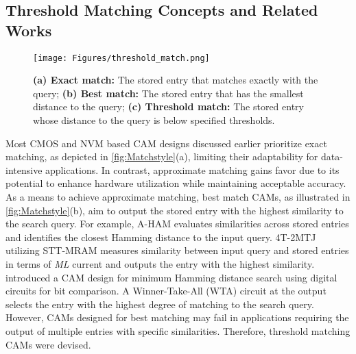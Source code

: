 \subsection{Threshold Matching Concepts and Related Works}
\label{sec:existing_work}

\begin{figure}
    \centering
    \texttt{[image: Figures/threshold\_match.png]}
    \caption{\textbf{(a) Exact match:} The stored entry that matches exactly with the query; \textbf{(b) Best match:} The stored entry that has the smallest distance to the query; \textbf{(c) Threshold match:} The stored entry whose distance to the query is below specified thresholds.}
\label{fig:Matchstyle}
\end{figure}


Most CMOS and NVM based CAM designs discussed earlier prioritize exact matching, as depicted in \autoref{fig:Matchstyle}(a), 
limiting their adaptability for data-intensive applications. 
In contrast, approximate matching gains favor due to its potential to enhance hardware utilization while maintaining acceptable accuracy. 
As a means to achieve approximate matching, best match CAMs, as illustrated in \autoref{fig:Matchstyle}(b), aim to output the stored entry with the highest similarity to the search query. 
For example, A-HAM \cite{AHAM} evaluates similarities across stored entries and identifies the closest Hamming distance to the input query. 
4T-2MTJ utilizing STT-MRAM \cite{STTMRAM} measures similarity between input query and stored entries in terms of \textit{ML} current and outputs the entry with the highest similarity. \cite{bestmatch} introduced a CAM design for minimum Hamming distance search using digital circuits for bit comparison. A Winner-Take-All (WTA) circuit at the output selects the entry with the highest degree of matching to the search query. However, CAMs designed for best matching may fail in applications requiring the output of multiple entries with specific similarities. Therefore, threshold matching CAMs were devised. 

